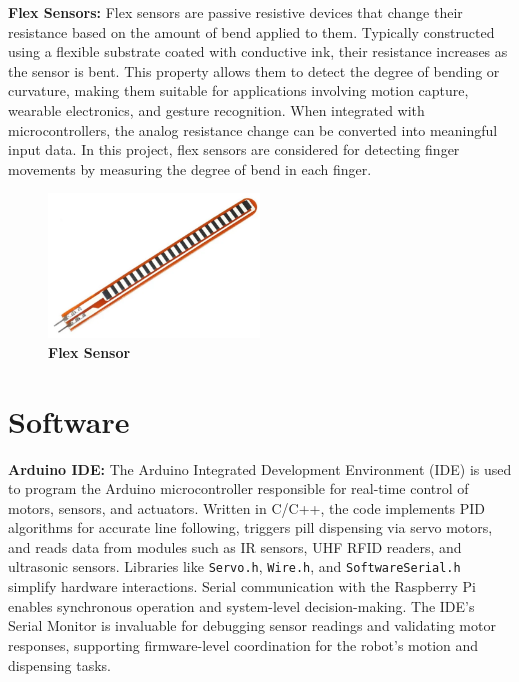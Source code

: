 \textbf{Flex Sensors: }Flex sensors are passive resistive devices that change their resistance based on the amount of bend applied to them. Typically constructed using a flexible substrate coated with conductive ink, their resistance increases as the sensor is bent. This property allows them to detect the degree of bending or curvature, making them suitable for applications involving motion capture, wearable electronics, and gesture recognition. When integrated with microcontrollers, the analog resistance change can be converted into meaningful input data. In this project, flex sensors are considered for detecting finger movements by measuring the degree of bend in each finger.

\begin{figure}[htbp!]
\centering
\includegraphics[width=0.5\textwidth]{images/3.4.png}
\caption{\textbf{Flex Sensor}}
\label{fig:3.4}
\end{figure}

\section{Software}

\textbf{Arduino IDE:} The Arduino Integrated Development Environment (IDE) is used to program the Arduino microcontroller responsible for real-time control of motors, sensors, and actuators. Written in C/C++, the code implements PID algorithms for accurate line following, triggers pill dispensing via servo motors, and reads data from modules such as IR sensors, UHF RFID readers, and ultrasonic sensors. Libraries like \texttt{Servo.h}, \texttt{Wire.h}, and \texttt{SoftwareSerial.h} simplify hardware interactions. Serial communication with the Raspberry Pi enables synchronous operation and system-level decision-making. The IDE’s Serial Monitor is invaluable for debugging sensor readings and validating motor responses, supporting firmware-level coordination for the robot’s motion and dispensing tasks.

\vspace{0.5em}

